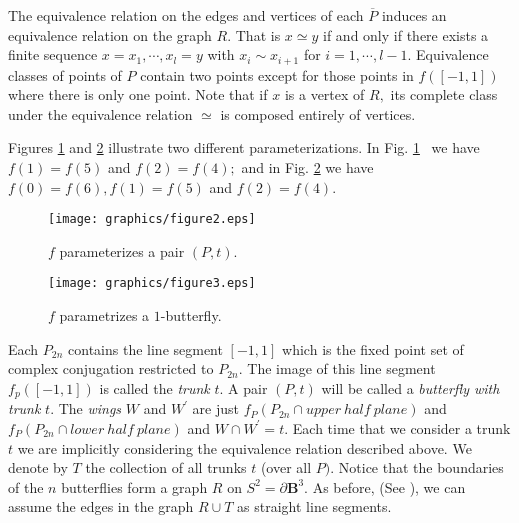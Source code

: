 \documentclass{amsproc}\usepackage{eurosym}
\theoremstyle{plain}
\numberwithin{equation}{section}
\begin{document}
The equivalence relation on the edges and vertices of each $\overline{P}$
induces an equivalence relation on the graph $R.$ That is $x\simeq y$ if and
only if there exists a finite sequence $x=x_{1},\cdots,x_{l}=y$ with
$x_{i}\sim x_{i+1}$ for $i=1,\cdots,l-1.$ Equivalence classes of points of $P
$ contain two points except for those points in $f\left(  \left[  -1,1\right]
\right)  $ where there is only one point. Note that if $x$ is a vertex of $R,$
its complete class under the equivalence relation $\simeq$ is composed
entirely of vertices.

Figures \ref{fig1a} and \ref{fig1b} illustrate two different
parameterizations. In Fig. \ref{fig1a} \ we have $f(1)=f(5)$ and $f(2)=f(4);$
and in Fig. \ref{fig1b} we have $f\left(  0\right)  =f\left(  6\right)
,f\left(  1\right)  =f\left(  5\right)  $ and $f\left(  2\right)  =f\left(
4\right)  .$
\begin{figure}
[ptb]
\begin{center}
\texttt{[image: graphics/figure2.eps]}\caption{$f$ parameterizes a pair $(P,t)$.}\label{fig1a}\end{center}
\end{figure}

\begin{figure}
[h]
\begin{center}
\texttt{[image: graphics/figure3.eps]}\caption{$f$ parametrizes a $1$-butterfly. }\label{fig1b}\end{center}
\end{figure}



Each $P_{2n}$ contains the line segment $\left[  -1,1\right]  $ which is the
fixed point set of complex conjugation restricted to $P_{2n}.$ The image of
this line segment $f_{p}\left(  \left[  -1,1\right]  \right)  $ is called the
\textit{trunk} $t$. A pair $\left(  P,t\right)  $ will be called a
\textit{butterfly with trunk} $t.$ The \textit{wings} $W$ and $W^{\prime}$ are
just $f_{P}\left(  P_{2n}\cap upper\ half\ plane\right)  $ and $f_{P}\left(
P_{2n}\cap lower\ half\ plane\right)  $ and $W\cap W^{\prime}=t.$ Each time
that we consider a trunk $t$ we are implicitly considering the equivalence
relation described above. We denote by $T$ the collection of all trunks $t$
(over all $P).$ Notice that the boundaries of the $n$ butterflies form a graph
$R$ on $S^{2}=\partial\mathbf{B}^{3}.$ As before, (See \cite{F1}), we can
assume the edges in the graph $R\cup T$ as straight line segments.
\end{document}

